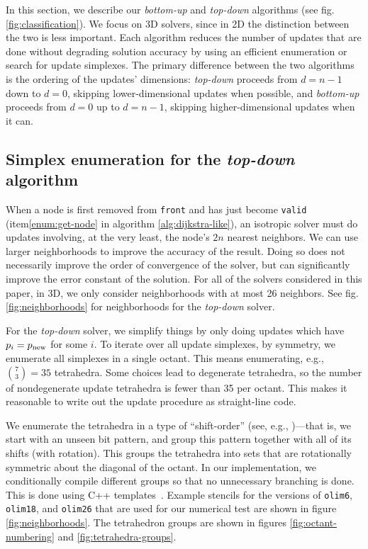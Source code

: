 \documentclass[smallcondensed]{svjour3}
\begin{document}
In this section, we describe our \emph{bottom-up} and \emph{top-down}
algorithms (see fig.\@ \ref{fig:classification}). We focus on 3D
solvers, since in 2D the distinction between the two is less
important. Each algorithm reduces the number of updates that are done
without degrading solution accuracy by using an efficient enumeration
or search for update simplexes. The primary difference between the two
algorithms is the ordering of the updates' dimensions: \emph{top-down}
proceeds from $d = n - 1$ down to $d = 0$, skipping lower-dimensional
updates when possible, and \emph{bottom-up} proceeds from $d = 0$ up
to $d = n - 1$, skipping higher-dimensional updates when it can.

\subsection{Simplex enumeration for the \emph{top-down}
  algorithm}\label{ssec:simplex-enumeration}

When a node is first removed from \texttt{front} and has just become
\texttt{valid} (item\@ \ref{enum:get-node} in algorithm\@
\ref{alg:dijkstra-like}), an isotropic solver must do updates
involving, at the very least, the node's $2n$ nearest neighbors. We
can use larger neighborhoods to improve the accuracy of the
result. Doing so does not necessarily improve the order of convergence
of the solver, but can significantly improve the error constant of the
solution. For all of the solvers considered in this paper, in 3D, we
only consider neighborhoods with at most 26 neighbors. See fig.\@
\ref{fig:neighborhoods} for neighborhoods for the \emph{top-down}
solver.

For the \emph{top-down} solver, we simplify things by only doing
updates which have $p_i = p_{\operatorname{new}}$ for some $i$. To iterate over all
update simplexes, by symmetry, we enumerate all simplexes in a single
octant. This means enumerating, e.g., ${7 \choose 3} = 35$
tetrahedra. Some choices lead to degenerate tetrahedra, so the number
of nondegenerate update tetrahedra is fewer than 35 per octant. This
makes it reasonable to write out the update procedure as straight-line
code.

We enumerate the tetrahedra in a type of ``shift-order'' (see, e.g.,
\cite{arndt2010matters})---that is, we start with an unseen bit
pattern, and group this pattern together with all of its shifts (with
rotation). This groups the tetrahedra into sets that are rotationally
symmetric about the diagonal of the octant. In our implementation, we
conditionally compile different groups so that no unnecessary
branching is done. This is done using C++
templates~\cite{stroustrup2013c++}. Example stencils for the versions
of \texttt{olim6}, \texttt{olim18}, and \texttt{olim26} that are used
for our numerical test are shown in figure
\ref{fig:neighborhoods}. The tetrahedron groups are shown in figures
\ref{fig:octant-numbering} and \ref{fig:tetrahedra-groups}.
\end{document}
